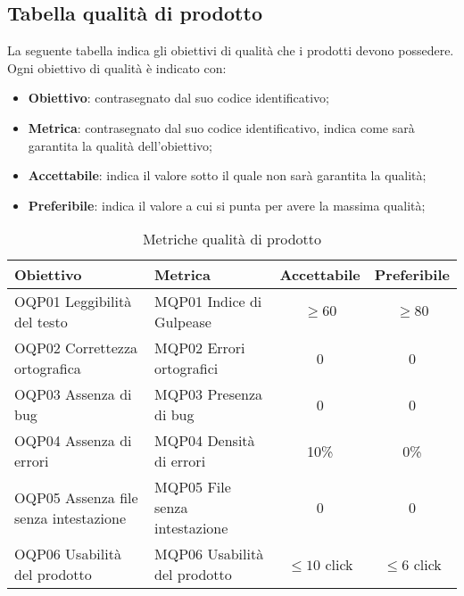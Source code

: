 \documentclass[../piano_di_qualifica.tex]{subfiles}
\begin{document}
\subsection{Tabella qualità di prodotto}
La seguente tabella indica gli obiettivi di qualità che i prodotti devono possedere.\\
Ogni obiettivo di qualità è indicato con:
\smallbreak
\begin{itemize}
	\item \textbf{Obiettivo}: contrasegnato dal suo codice identificativo;
	\item \textbf{Metrica}: contrasegnato dal suo codice identificativo, indica come sarà garantita la qualità dell'obiettivo;
	\item \textbf{Accettabile}: indica il valore sotto il quale non sarà garantita la qualità;
	\item \textbf{Preferibile}: indica il valore a cui si punta per avere la massima qualità;
\end{itemize}

\begin{table}[!ht]
	\centering
	\begin{tabular}{|l|l|c|c|}
		\hline
		\rowcolor{lightgray}
	\textbf{Obiettivo}  & \textbf{Metrica} & \textbf{Accettabile} & \textbf{Preferibile} \\
		\hline
		OQP01 Leggibilità del testo & MQP01 Indice di Gulpease  & \(\ge 60\)  & \(\ge 80\)   \\
		\hline
		OQP02 Correttezza ortografica   & MQP02 Errori ortografici   &     0    &  0  \\
		\hline
		OQP03 Assenza di bug   & MQP03 Presenza di bug    & 0  & 0   \\
		\hline
		OQP04 Assenza di errori & MQP04 Densità di errori & 10\%     & 0\%     \\
		\hline
		OQP05 Assenza file senza intestazione  & MQP05 File senza intestazione     & 0   & 0   \\
		\hline
		OQP06 Usabilità del prodotto  & MQP06 Usabilità del prodotto  & \(\leq10\) click  & \(\leq6\) click   \\
		\hline
	\end{tabular}
	\caption{Metriche qualità di prodotto}
\end{table}
\end{document}
